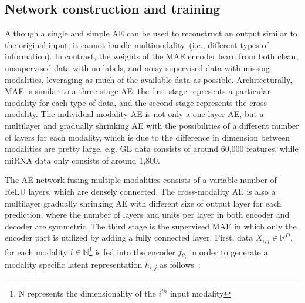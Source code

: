 
\subsection{Network construction and training}
Although a single and simple AE can be used to reconstruct an output similar to the original input, it cannot handle multimodality~(i.e., different types of information). In contrast, the weights of the MAE encoder learn from both clean, unsupervised data with no labels, and noisy supervised data with missing modalities, leveraging as much of the available data as possible. Architecturally, MAE is similar to a three-stage AE: the first stage represents a particular modality for each type of data, and the second stage represents the cross-modality. 
The individual modality AE is not only a one-layer AE, but a multilayer and gradually shrinking AE with the possibilities of a different number of layers for each modality, which is due to the difference in dimension between modalities are pretty large, e.g. GE data consists of around 60,000 features, while miRNA data only consists of around 1,800. 

\hspace*{3.5mm} The AE network fusing multiple modalities consists of a variable number of ReLU layers, which are densely connected. The cross-modality AE is also a multilayer gradually shrinking AE with different size of output layer for each prediction, where the number of layers and units per layer in both encoder and decoder are symmetric. The third stage is the supervised MAE in which only the encoder part is utilized by adding a fully connected layer. %
First, data $X_{i,j} \in \mathbb{R}^{D}$, for each modality $i \in \mathbb{N}$\footnote{N represents the dimensionality of the $i^{th}$ input modality} is fed into the encoder $f_{\theta_{i}}$ in order to generate a modality specific latent representation $h_{i, j}$ as follows~\cite{mmdcae}: 


